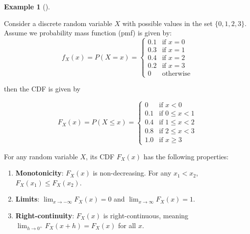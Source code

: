 \documentclass[
  letterpaper,
]{scrbook}
\providecommand{\tightlist}{%
  \setlength{\itemsep}{0pt}\setlength{\parskip}{0pt}}
\theoremstyle{definition}
\theoremstyle{plain}
\theoremstyle{plain}
\theoremstyle{definition}
\newtheorem{example}{Example}[chapter]
\theoremstyle{remark}
\begin{document}
\begin{tcolorbox}[enhanced jigsaw, bottomtitle=1mm, coltitle=black, toprule=.15mm, toptitle=1mm, bottomrule=.15mm, colback=white, arc=.35mm, opacityback=0, breakable, title={CDF of a discrete random variable}, titlerule=0mm, rightrule=.15mm, colbacktitle=quarto-callout-note-color!10!white, colframe=quarto-callout-note-color-frame, opacitybacktitle=0.6, leftrule=.75mm, left=2mm]

\begin{example}[]\protect\hypertarget{exm-cdf-discrete}{}\label{exm-cdf-discrete}

Consider a discrete random variable \(X\) with possible values in the
set \(\{0, 1, 2, 3\}\). Assume we probability mass function (pmf) is
given by: \[
f_X(x) = P(X=x) =
\begin{cases}
0.1 & \text{if } x = 0 \\
0.3 & \text{if } x = 1 \\
0.4 & \text{if } x = 2 \\
0.2 & \text{if } x = 3 \\
0 & \text{otherwise}
\end{cases}
\]

then the CDF is given by

\[
F_X(x) = P(X \le x) = 
\begin{cases}
0 & \text{if } x < 0 \\
0.1 & \text{if } 0 \le x < 1 \\
0.4 & \text{if } 1 \le x < 2 \\
0.8 & \text{if } 2 \le x < 3 \\
1.0 & \text{if } x \ge 3
\end{cases}
\]

\end{example}

\end{tcolorbox}

\begin{tcolorbox}[enhanced jigsaw, bottomtitle=1mm, coltitle=black, toprule=.15mm, toptitle=1mm, bottomrule=.15mm, colback=white, arc=.35mm, opacityback=0, breakable, title={Properties of Cumulative Distribution Functions}, titlerule=0mm, rightrule=.15mm, colbacktitle=quarto-callout-note-color!10!white, colframe=quarto-callout-note-color-frame, opacitybacktitle=0.6, leftrule=.75mm, left=2mm]

\label{properties-cdf}
For any random variable \(X\), its CDF \(F_X(x)\) has the following
properties:

\begin{enumerate}
\def\labelenumi{\arabic{enumi}.}
\tightlist
\item
  \textbf{Monotonicity}: \(F_X(x)\) is non-decreasing. For any
  \(x_1 < x_2\), \(F_X(x_1) \le F_X(x_2)\).
\item
  \textbf{Limits}: \(\lim_{x \to -\infty} F_X(x) = 0\) and
  \(\lim_{x \to \infty} F_X(x) = 1\).
\item
  \textbf{Right-continuity}: \(F_X(x)\) is right-continuous, meaning
  \(\lim_{h \to 0^+} F_X(x+h) = F_X(x)\) for all \(x\).
\end{enumerate}

\end{tcolorbox}
\end{document}
